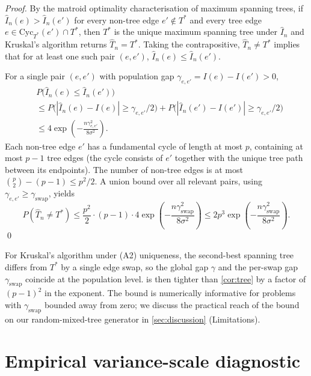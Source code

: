\emph{Proof.} By the matroid optimality characterisation of
maximum spanning trees, if $\hat{I}_n(e) > \hat{I}_n(e')$ for every
non-tree edge $e' \notin T^*$ and every tree edge
$e \in \mathrm{Cyc}_{T^*}(e') \cap T^*$, then $T^*$ is the unique
maximum spanning tree under $\hat{I}_n$ and Kruskal's algorithm
returns $\hat{T}_n = T^*$. Taking the contrapositive,
$\hat{T}_n \ne T^*$ implies that for at least one such pair
$(e, e')$, $\hat{I}_n(e) \le \hat{I}_n(e')$.

For a single pair $(e, e')$ with population gap
$\gamma_{e, e'} = I(e) - I(e') > 0$,
\begin{align*}
& P\bigl(\hat{I}_n(e) \le \hat{I}_n(e')\bigr) \\
& \le P\bigl(|\hat{I}_n(e) - I(e)| \ge \gamma_{e, e'}/2\bigr)
   + P\bigl(|\hat{I}_n(e') - I(e')| \ge \gamma_{e, e'}/2\bigr) \\
& \le 4 \exp\!\left(-\frac{n \gamma_{e, e'}^2}{8 \sigma^2}\right).
\end{align*}
Each non-tree edge $e'$ has a fundamental cycle of length at most
$p$, containing at most $p - 1$ tree edges (the cycle consists of
$e'$ together with the unique tree path between its endpoints). The number of
non-tree edges is at most $\binom{p}{2} - (p-1) \le p^2/2$. A union
bound over all relevant pairs, using
$\gamma_{e, e'} \ge \gamma_{\mathrm{swap}}$, yields
\begin{equation*}
P(\hat{T}_n \ne T^*) \le \frac{p^2}{2} \cdot (p - 1) \cdot 4
\exp\!\left(-\frac{n \gamma_{\mathrm{swap}}^2}{8 \sigma^2}\right)
\le 2 p^3 \exp\!\left(-\frac{n \gamma_{\mathrm{swap}}^2}{8 \sigma^2}\right).
\end{equation*}
\qed

\begin{remark}
For Kruskal's algorithm under (A2) uniqueness, the second-best
spanning tree differs from $T^*$ by a single edge swap, so the
global gap $\gamma$ and the per-swap gap $\gamma_{\mathrm{swap}}$
coincide at the population level.  is then
tighter than \cref{cor:tree} by a factor of $(p-1)^2$ in
the exponent. The bound is numerically informative for problems with
$\gamma_{\mathrm{swap}}$ bounded away from zero; we discuss the
practical reach of the bound on our random-mixed-tree generator in
\cref{sec:discussion} (Limitations).
\end{remark}

\section{Empirical variance-scale diagnostic}
\label{app:sigma}

